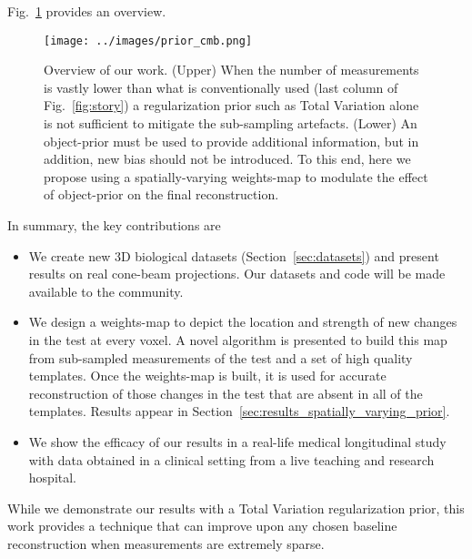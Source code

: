 \documentclass[journal]{IEEEtran}
\begin{document}
Fig.~\ref{fig:prior_overview} provides an overview.


 \begin{figure}[h]
\centering
	\texttt{[image: ../images/prior\_cmb.png]}
        \caption{Overview of our work. (Upper) When the number of
          measurements is vastly lower than what is conventionally
          used (last column of Fig.~\ref{fig:story}) a regularization
          prior such as Total Variation alone is not sufficient to
          mitigate the sub-sampling artefacts. (Lower) An object-prior
          must be used to provide additional information, but in
          addition, new bias should not be introduced. To this end,
          here we propose using a spatially-varying weights-map to
          modulate the effect of object-prior on the final
          reconstruction.}
 \label{fig:prior_overview}
\end{figure}

In summary, the key contributions are
\begin{itemize}
\item We create new 3D biological datasets (Section~\ref{sec:datasets}) and
  present results on real cone-beam projections. Our datasets and code
  will be made available to the community.
  \item We design a weights-map
    to depict the location and strength of new changes in the test at
    every voxel. A novel algorithm is presented to build this map from
    sub-sampled measurements of the test and a set of high quality
    templates. Once the weights-map is built, it is used for accurate
    reconstruction of those changes in the test that are absent in all
    of the templates. Results appear in
    Section~\ref{sec:results_spatially_varying_prior}.
  \item We show the efficacy of our results in a real-life medical
    longitudinal study with data obtained in a clinical setting from
    a live teaching and
    research hospital.
\end{itemize}
While we demonstrate our results with a Total Variation regularization
prior, this work provides a technique that can improve upon any chosen
baseline reconstruction when measurements are extremely sparse.  
\end{document}
